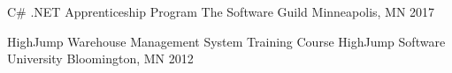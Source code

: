 \begin{cventries}
  \cventry
    {C\# .NET Apprenticeship Program}
    {The Software Guild}
    {Minneapolis, MN}
    {2017}
    {}{}{}

  \cventry
    {HighJump Warehouse Management System Training Course}
    {HighJump Software University}
    {Bloomington, MN}
    {2012}
    {}{}{}
\end{cventries}
